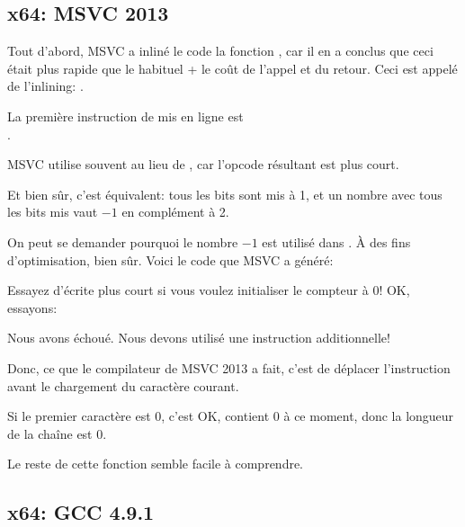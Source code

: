 ﻿\subsection{x64: MSVC 2013 \Optimizing}



Tout d'abord, MSVC a inliné le code la fonction \strlen{}, car il en a conclus que
ceci était plus rapide que le \strlen{} habituel + le coût de l'appel et du retour.
Ceci est appelé de l'inlining: .

\label{using_OR_instead_of_MOV}
La première instruction de \strlen{} mis en ligne est\\
. 

MSVC utilise souvent  au lieu de , car l'opcode
résultant est plus court.

Et bien sûr, c'est équivalent: tous les bits sont mis à 1, et un nombre avec tous
les bits mis vaut $-1$ en complément à 2.

On peut se demander pourquoi le nombre $-1$ est utilisé dans \strlen{}.
À des fins d'optimisation, bien sûr.
Voici le code que MSVC a généré:



Essayez d'écrite plus court si vous voulez initialiser le compteur à 0!
OK, essayons:



Nous avons échoué. Nous devons utilisé une instruction  additionnelle!

Donc, ce que le compilateur de MSVC 2013 a fait, c'est de déplacer l'instruction
 avant le chargement du caractère courant.

Si le premier caractère est 0, c'est OK, \RAX contient 0 à ce moment, donc la longueur
de la chaîne est 0.

Le reste de cette fonction semble facile à comprendre.

\subsection{x64: GCC 4.9.1 \NonOptimizing}


